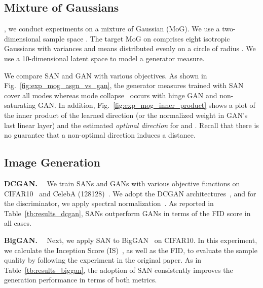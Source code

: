 \subsection{Mixture of Gaussians}
\label{ssec:exp_synthetic}
, we conduct experiments on a mixture of Gaussian (MoG).  We use a two-dimensional sample space . The target MoG on  comprises eight isotropic Gaussians with variances  and means distributed evenly on a circle of radius . We use a 10-dimensional latent space  to model a generator measure.

We compare SAN and GAN with various objectives. As shown in Fig.~\ref{fig:exp_mog_asgn_vs_gan}, the generator measures trained with SAN cover all modes whereas mode collapse~\citep{srivastava2017veegan} occurs with hinge GAN and non-saturating GAN.
In addition, Fig.~\ref{fig:exp_mog_inner_product} shows a plot of the inner product of the learned direction  (or the normalized weight in GAN's last linear layer) and the estimated \textit{optimal direction} for  and .
Recall that there is no guarantee that a non-optimal direction  induces a distance.


\subsection{Image Generation}
\label{ssec:exp_image}


\textbf{DCGAN.}~~
We train SANs and GANs with various objective functions on CIFAR10~\citep{krizhevsky2009learning} and CelebA (128128)~\citep{liu2015deep}. We adopt the DCGAN architectures~\citep{radford2015unsupervised}, and for the discriminator, we apply spectral normalization~\citep{miyato2018spectral}. As reported in Table~\ref{tb:results_dcgan}, SANs outperform GANs in terms of the FID score in all cases.

\textbf{BigGAN.}~~
Next, we apply SAN to BigGAN~\citep{brock2018large} on CIFAR10. In this experiment, we calculate the Inception Score (IS)~\citep{salimans2016improved}, as well as the FID, to evaluate the sample quality by following the experiment in the original paper. As in Table~\ref{tb:results_biggan}, the adoption of SAN consistently improves the generation performance in terms of both metrics.

